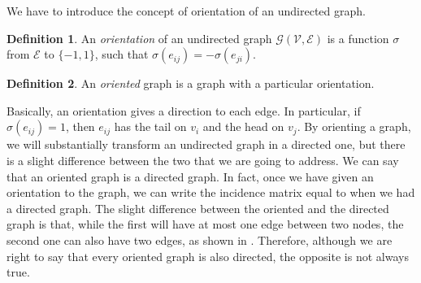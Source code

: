 \documentclass[12pt,a4paper]{report}
\theoremstyle{definition}
\newtheorem{definition}{Definition}[chapter]
\begin{document}
We have to introduce the concept of orientation of an undirected graph.
\begin{definition}
An \emph{orientation} of an undirected graph $\mathcal{G}\left( \mathcal{V}, \mathcal{E} \right)$ is a function $\sigma$ from $\mathcal{E}$ to $\{-1, 1\}$, such that $\sigma(e_{ij}) = -\sigma (e_{ji})$.
\end{definition}
\begin{definition}
An \emph{oriented} graph is a graph with a particular orientation.
\end{definition}
Basically, an orientation gives a direction to each edge.
In particular, if $\sigma (e_{ij})=1$, then $e_{ij}$ has the tail on $v_i$ and the head on $v_j$.
By orienting a graph, we will substantially transform an undirected graph in a directed one, but there is a slight difference between the two that we are going to address. 
We can say that an oriented graph is a directed graph.
In fact, once we have given an orientation to the graph, we can write the incidence matrix equal to when we had a directed graph. 
The slight difference between the oriented and the directed graph is that, while the first will have at most one edge between two nodes, the second one can also have two edges, as shown in .
Therefore, although we are right to say that every oriented graph is also directed, the opposite is not always true.
\end{document}
